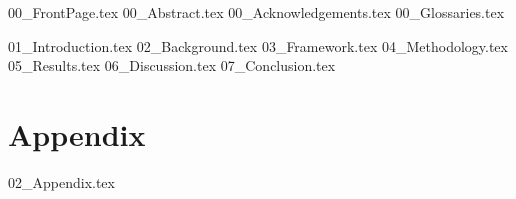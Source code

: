 \documentclass[12pt, a4paper]{article}
\begin{document}
{00_FrontPage.tex}
\newpage
{00_Abstract.tex}
\newpage
{00_Acknowledgements.tex}
\newpage
{00_Glossaries.tex}
\newpage

\pagestyle{maintext}
\setcounter{page}{1}

\setcounter{page}{1}%
{01_Introduction.tex}
\newpage
{02_Background.tex}
\newpage
{03_Framework.tex}
\newpage
{04_Methodology.tex}
\newpage
{05_Results.tex}
\newpage
{06_Discussion.tex}
\newpage
{07_Conclusion.tex}

\newpage
\pagestyle{appendix}
\part*{Appendix}
\setcounter{section}{0} \renewcommand{\thesection}{A\arabic{section}}
\setcounter{figure}{0} \renewcommand{\thefigure}{A\arabic{figure}}
\setcounter{table}{0} \renewcommand{\thetable}{A\arabic{table}}
\setcounter{equation}{0} \renewcommand{\theequation}{A\arabic{equation}}

{02_Appendix.tex}

% 
% 


\end{document}
